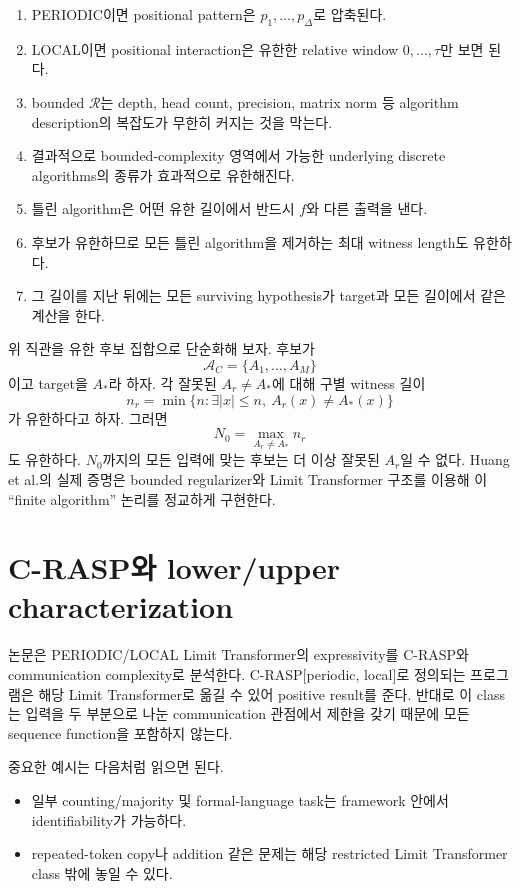 \documentclass[11pt,a4paper,oneside,openany]{memoir}
\newcommand{\Risk}{\mathcal{R}}
\theoremstyle{definition}
\begin{document}
\begin{enumerate}
\item PERIODIC이면 positional pattern은 $p_1,\ldots,p_\Delta$로 압축된다.
\item LOCAL이면 positional interaction은 유한한 relative window $0,\ldots,\tau$만 보면 된다.
\item bounded $\Risk$는 depth, head count, precision, matrix norm 등 algorithm description의 복잡도가 무한히 커지는 것을 막는다.
\item 결과적으로 bounded-complexity 영역에서 가능한 underlying discrete algorithms의 종류가 효과적으로 유한해진다.
\item 틀린 algorithm은 어떤 유한 길이에서 반드시 $f$와 다른 출력을 낸다.
\item 후보가 유한하므로 모든 틀린 algorithm을 제거하는 최대 witness length도 유한하다.
\item 그 길이를 지난 뒤에는 모든 surviving hypothesis가 target과 모든 길이에서 같은 계산을 한다.
\end{enumerate}

\begin{suppbox}
위 직관을 유한 후보 집합으로 단순화해 보자. 후보가
\[
\mathcal A_C=\{A_1,\ldots,A_M\}
\]
이고 target을 $A_*$라 하자. 각 잘못된 $A_r\ne A_*$에 대해 구별 witness 길이
\[
n_r=\min\{n:\exists |x|\le n,\ A_r(x)\ne A_*(x)\}
\]
가 유한하다고 하자. 그러면
\[
N_0=\max_{A_r\ne A_*}n_r
\]
도 유한하다. $N_0$까지의 모든 입력에 맞는 후보는 더 이상 잘못된 $A_r$일 수 없다.
Huang et al.의 실제 증명은 bounded regularizer와 Limit Transformer 구조를 이용해 이 ``finite algorithm'' 논리를 정교하게 구현한다.
\end{suppbox}

\section{C-RASP와 lower/upper characterization}

논문은 PERIODIC/LOCAL Limit Transformer의 expressivity를 C-RASP와 communication complexity로 분석한다.
C-RASP[periodic, local]로 정의되는 프로그램은 해당 Limit Transformer로 옮길 수 있어 positive result를 준다.
반대로 이 class는 입력을 두 부분으로 나눈 communication 관점에서 제한을 갖기 때문에 모든 sequence function을 포함하지 않는다.

중요한 예시는 다음처럼 읽으면 된다.

\begin{itemize}
\item 일부 counting/majority 및 formal-language task는 framework 안에서 identifiability가 가능하다.
\item repeated-token copy나 addition 같은 문제는 해당 restricted Limit Transformer class 밖에 놓일 수 있다.
\end{itemize}
\end{document}

